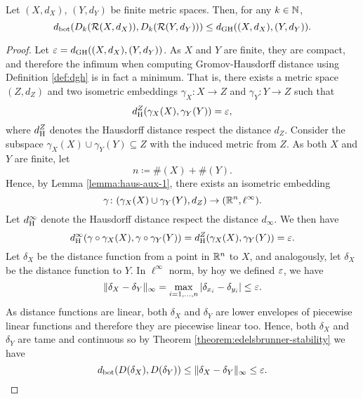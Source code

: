 \begin{theorem} \label{theorem:gh-stability}
    Let $ (X, d_X) $, $ (Y, d_Y) $ be finite metric spaces. Then, for any $ k \in \mathbb N$, 
    \begin{equation}
        d_{\operatorname{bot}}( D_k(\mathcal{R}(X, d_X)), D_k(\mathcal{R}(Y, d_Y))) \leq d_{\operatorname{GH}}((X, d_X), (Y, d_Y)).
    \end{equation}
\end{theorem}
\begin{proof}
    Let $ \varepsilon = d_{\operatorname{GH}}((X, d_X), (Y, d_Y)) $. As $ X $ and $ Y $ are finite, they are compact, and therefore the infimum when computing Gromov-Hausdorff distance using Definition \ref{def:dgh} is in fact a minimum. That is, there exists a metric space $ (Z, d_Z) $ and two isometric embeddings $ \gamma_X \colon X \to Z $ and $ \gamma_Y \colon Y \to Z $ such that
    \begin{equation}
        d_{\operatorname{H}}^Z(\gamma_X(X), \gamma_Y(Y)) = \varepsilon,
    \end{equation}
    where $ d_{\operatorname{H}}^Z $ denotes the Hausdorff distance respect the distance $ d_Z $. Consider the subspace $ \gamma_X(X) \cup \gamma_Y(Y) \subseteq Z $ with the induced metric from $ Z $. As both $ X $ and $ Y $ are finite, let
    \begin{equation}
        n \coloneq \#(X) + \#(Y). 
    \end{equation}
    Hence, by Lemma \ref{lemma:haus-aux-1}, there exists an isometric embedding
    \begin{equation}
        \gamma \colon (\gamma_X(X) \cup \gamma_Y(Y), d_Z) \to (\mathbb R^n, \ell^\infty).
    \end{equation}
    Let $ d_{\operatorname{H}}^\infty $ denote the Hausdorff distance respect the distance $ d_\infty $. We then have
    \begin{equation}
        d_{\operatorname{H}}^\infty(\gamma \circ \gamma_X(X), \gamma \circ \gamma_Y(Y)) = d_{\operatorname{H}}^Z(\gamma_X(X), \gamma_Y(Y)) = \varepsilon.
    \end{equation}
    Let $ \delta_X $ be the distance function from a point in $ \mathbb R^n $ to $ X $, and analogously, let $ \delta_X $ be the distance function to $ Y $. In $ \ell^\infty $ norm, by hoy we defined $\varepsilon$, we have
    \begin{equation}
        \| \delta_X - \delta_Y \|_\infty = \max_{i=1, \dots, n} | \delta_{x_i} - \delta_{y_i} | \leq \varepsilon.
    \end{equation}
    As distance functions are linear, both $ \delta_X $ and $ \delta_Y $ are lower envelopes of piecewise linear functions and therefore they are piecewise linear too. Hence,  both $ \delta_X $ and $ \delta_Y $ are tame and continuous so by Theorem \ref{theorem:edelsbrunner-stability} we have
    \begin{equation}
        d_{\operatorname{bot}}(D(\delta_X), D(\delta_Y)) \leq \| \delta_X - \delta_Y \|_\infty \leq \varepsilon.
    \end{equation}


\end{proof}
